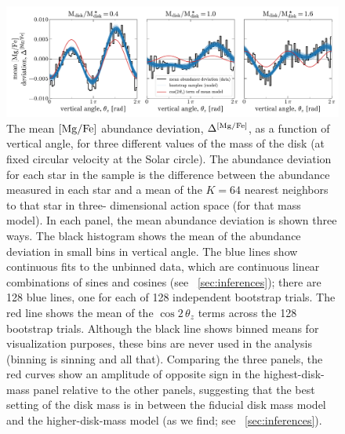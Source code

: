 \documentclass[modern]{aastex63}
\begin{document}
\begin{figure}[!tp] %
  \begin{mdframed}[style=figure]
  \begin{center}
  \includegraphics[width=\textwidth]{sinusoid-fits.pdf}
  \end{center}
  \caption{%
    The mean ${[\mathrm{Mg}/\mathrm{Fe}]}$ abundance deviation, $\Delta^{{[\mathrm{Mg}/\mathrm{Fe}]}}$, as a
    function of vertical angle, for three different values of the mass of the
    disk (at fixed circular velocity at the Solar circle).
    The abundance deviation for each star in the sample is the difference
    between the abundance measured in each star and a mean of the $K=64$ nearest
    neighbors to that star in three- dimensional action space (for that mass
    model).
    In each panel, the mean abundance deviation is shown three ways.
    The black histogram shows the mean of the abundance deviation in small bins
    in vertical angle.
    The blue lines show continuous fits to the unbinned data, which are
    continuous linear combinations of sines and cosines (see
    \sectionname~\ref{sec:inferences}); there are 128 blue lines, one for each
    of 128 independent bootstrap trials.
    The red line shows the mean of the $\cos 2\,\theta_z$ terms across the
    128 bootstrap trials.
    Although the black line shows binned means for visualization purposes,
    these bins are never used in the analysis (binning is sinning and all that).
    Comparing the three panels, the red curves show an amplitude of opposite
    sign in the highest-disk-mass panel relative to the other panels, suggesting
    that the best setting of the disk mass is in between the fiducial disk mass
    model and the higher-disk-mass model (as we find; see
    \sectionname~\ref{sec:inferences}).
  \label{fig:sinusoid-fits}
  }
  \end{mdframed}
\end{figure}
\end{document}
